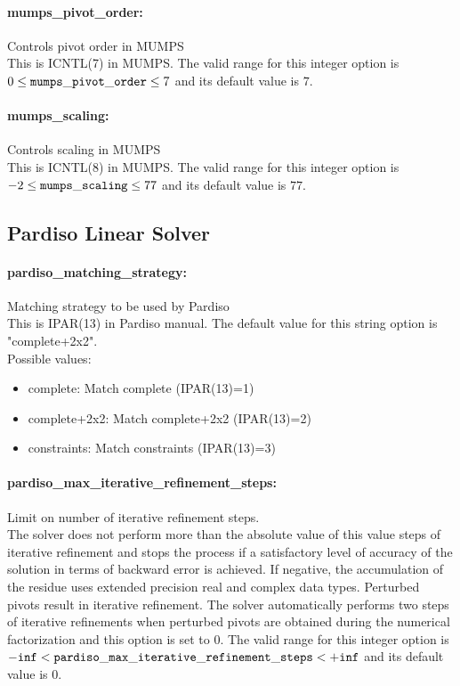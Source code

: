 \paragraph{mumps\_pivot\_order:}\label{opt:mumps_pivot_order} Controls pivot order in MUMPS \\
 This is ICNTL(7) in MUMPS. The valid range for this integer option is
$0 \le {\tt mumps\_pivot\_order } \le 7$
and its default value is $7$.


\paragraph{mumps\_scaling:}\label{opt:mumps_scaling} Controls scaling in MUMPS \\
 This is ICNTL(8) in MUMPS. The valid range for this integer option is
$-2 \le {\tt mumps\_scaling } \le 77$
and its default value is $77$.


\subsection{Pardiso Linear Solver}

\paragraph{pardiso\_matching\_strategy:}\label{opt:pardiso_matching_strategy} Matching strategy to be used by Pardiso \\
 This is IPAR(13) in Pardiso manual. The default value for this string option is "complete+2x2".
\\ 
Possible values:
\begin{itemize}
   \item complete: Match complete (IPAR(13)=1)
   \item complete+2x2: Match complete+2x2 (IPAR(13)=2)
   \item constraints: Match constraints (IPAR(13)=3)
\end{itemize}

\paragraph{pardiso\_max\_iterative\_refinement\_steps:}\label{opt:pardiso_max_iterative_refinement_steps} Limit on number of iterative refinement steps. \\
 The solver does not perform more than the absolute value of this value steps of iterative refinement and stops the process if a satisfactory level of accuracy of the solution in terms of backward error is achieved. If negative, the accumulation of the residue uses extended precision real and complex data types. Perturbed pivots result in iterative refinement. The solver automatically performs two steps of iterative refinements when perturbed pivots are obtained during the numerical factorization and this option is set to 0. The valid range for this integer option is
${\tt -inf} <  {\tt pardiso\_max\_iterative\_refinement\_steps } <  {\tt +inf}$
and its default value is $0$.


